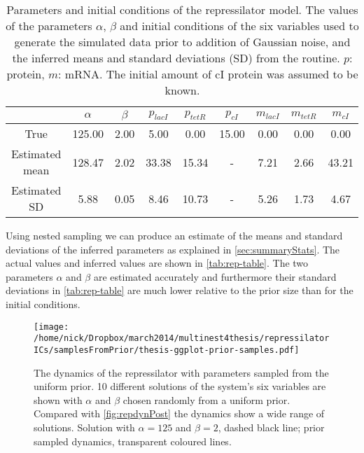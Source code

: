 \begin{table*}[!htbp]
  \centering
  \begin{tabular}{ccccccccc}
    \toprule
    & $\alpha$ & $\beta$ & $p_{lacI}$ & $p_{tetR}$ & $p_{cI}$ & $m_{lacI}$ & $m_{tetR}$ & $m_{cI}$ \\
    \midrule
    True & 125.00 & 2.00 & 5.00 & 0.00 & 15.00 & 0.00 & 0.00 & 0.00 \\
    Estimated mean & 128.47 & 2.02 & 33.38 & 15.34 & - & 7.21 & 2.66 & 43.21 \\
    Estimated SD & 5.88 & 0.05 & 8.46 & 10.73 & - & 5.26 & 1.73 & 4.67 \\
    \bottomrule
  \end{tabular}
  \caption{Parameters and initial conditions of the repressilator model.
    The values of the parameters $\alpha$, $\beta$ and initial conditions of the six variables used to generate the simulated data prior to addition of Gaussian noise, and the inferred means and standard deviations (SD) from the routine.
    $p$: protein, $m$: mRNA\@.
    The initial amount of cI protein was assumed to be known.
  }
  \label{tab:rep-table}
\end{table*}

Using nested sampling we can produce an estimate of the means and standard deviations of the inferred parameters as explained in \autoref{sec:summaryStats}.
The actual values and inferred values are shown in \autoref{tab:rep-table}.
The two parameters $\alpha$ and $\beta$ are estimated accurately and furthermore their standard deviations in \autoref{tab:rep-table} are much lower relative to the prior size than for the initial conditions.

\begin{figure*}[!htbp]
  \texttt{[image: /home/nick/Dropbox/march2014/multinest4thesis/repressilatorICs/samplesFromPrior/thesis-ggplot-prior-samples.pdf]}
  \caption{The dynamics of the repressilator with parameters sampled from the uniform prior.
    10 different solutions of the system's six variables are shown with $\alpha$ and $\beta$ chosen randomly from a uniform prior. 
    Compared with \autoref{fig:repdynPost} the dynamics show a wide range of solutions. 
    Solution with $\alpha=125$ and $\beta=2$, dashed black line; prior sampled dynamics, transparent coloured lines.
  }
  \label{fig:repdynPrior}
\end{figure*}

